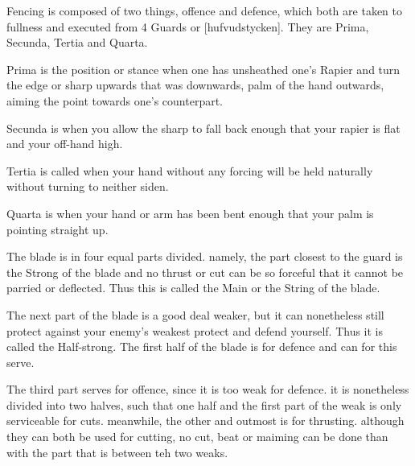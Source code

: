 \newpage


\newpage



Fencing is composed of two things, offence and defence, which both are
taken to fullness and executed from 4 Guards or [hufvudstycken]. They
are Prima, Secunda, Tertia and Quarta.

Prima is the position or stance when one has unsheathed one's Rapier
and turn the edge or sharp upwards that was downwards, palm of the
hand outwards, aiming the point towards one's counterpart.

Secunda is when you allow the sharp to fall back enough that your
rapier is flat and your off-hand high.

Tertia is called when your hand without any forcing will be held
naturally without turning to neither siden.

Quarta is when your hand or arm has been bent enough that your palm is
pointing straight up.


The blade is in four equal parts divided. namely, the part closest to
the guard is the Strong of the blade and no thrust or cut can be so
forceful that it cannot be parried or deflected. Thus this is called
the Main or the String of the blade.

The next part of the blade is a good deal weaker, but it can
nonetheless still protect against your enemy's weakest protect and
defend yourself. Thus it is called the Half-strong. The first half of
the blade is for defence and can for this serve.

The third part serves for offence, since it is too weak for
defence. it is nonetheless divided into two halves, such that one half
and the first part of the weak is only serviceable for
cuts. meanwhile, the other and outmost is for thrusting. although they
can both be used for cutting, no cut, beat or maiming can be done than
with the part that is between teh two weaks.
